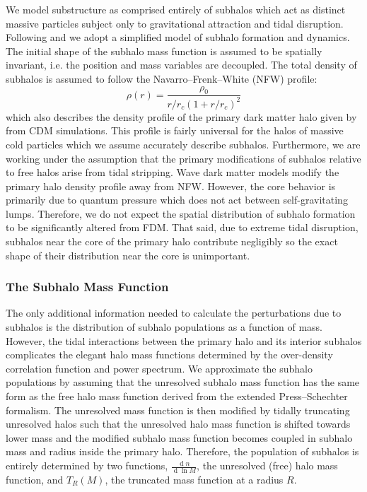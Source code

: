 \documentclass[usenatbib]{mnras}
\renewcommand{\d}[1]{\! \mathrm{d}#1 \:}
\renewcommand{\d}[1]{\ensuremath{\operatorname{d}\!{#1}}}
\begin{document}
	We model substructure as comprised entirely of subhalos which act as distinct massive particles subject only to gravitational attraction and tidal disruption. Following \citet{tidal_limit} and \cite{unified_model} we adopt a
simplified model of subhalo
formation and dynamics. The initial shape of
the subhalo mass function is assumed to
be spatially invariant, i.e. the position
and mass variables are decoupled. The
total density of subhalos is assumed to
follow the Navarro--Frenk--White (NFW) profile:
\begin{equation}
\rho(r) = \frac{\rho_0}{r/r_c (1+r/r_c)^2}
\end{equation} which also
describes the density profile of the
primary dark matter halo given by \citet{structure} from CDM simulations. This profile is fairly universal for the halos of massive cold particles which we assume accurately describe subhalos. Furthermore, we are working under the assumption that the primary modifications of subhalos relative to free halos arise from tidal stripping. Wave dark matter models modify the primary halo density profile away from NFW. However, the core behavior is primarily due to quantum pressure which does not act between self-gravitating lumps. Therefore, we do not expect the spatial distribution of subhalo formation to be significantly altered from FDM. That said, due to extreme tidal disruption, subhalos near the core of the primary halo contribute negligibly so the exact shape of their distribution near the core is unimportant.  

\subsubsection{The Subhalo Mass Function}

The only additional information needed to calculate the perturbations due to subhalos is the distribution of subhalo populations as a function of mass. However, the tidal interactions between the primary halo and its interior subhalos complicates the elegant halo mass functions determined by the over-density correlation function and power spectrum. We approximate the subhalo populations by assuming that the unresolved subhalo mass function has the same form as the free halo mass function derived from the extended Press--Schechter formalism. The unresolved mass function is then modified by tidally truncating unresolved halos such that the unresolved halo mass function is shifted towards lower mass and the modified subhalo mass function becomes coupled in subhalo mass and radius inside the primary halo. Therefore, the population of subhalos is entirely determined by two functions, $\frac{\d{n}}{\d{\ln{M}}}$, the unresolved (free) halo mass function, and $T_R(M)$, the truncated mass function at a radius $R$.
\end{document}
